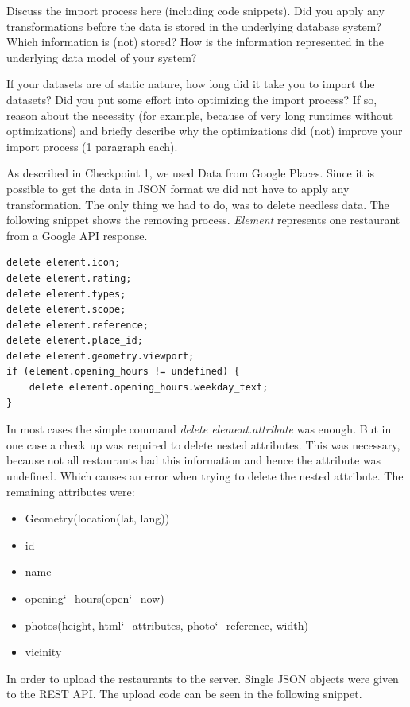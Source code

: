 Discuss the import process here (including code snippets). Did you apply any
transformations before the data is stored in the underlying database system?
Which information is (not) stored? How is the information represented in the
underlying data model of your system?

If your datasets are of static nature, how long did it take you to import the
datasets? Did you put some effort into optimizing the import process? If so,
reason about the necessity (for example, because of very long runtimes without
optimizations) and briefly describe why the optimizations did (not) improve your
import process (1 paragraph each).

As described in Checkpoint 1, we used Data from Google Places. Since it is possible to get the data in JSON format we did not have to apply any transformation. The only thing we had to do, was to delete needless data. The following snippet shows the removing process. \textit{Element} represents one restaurant from a Google API response.

\begin{lstlisting}
delete element.icon;
delete element.rating;
delete element.types;
delete element.scope;
delete element.reference;
delete element.place_id;
delete element.geometry.viewport;
if (element.opening_hours != undefined) {
	delete element.opening_hours.weekday_text;
}
\end{lstlisting}

In most cases the simple command \textit{delete element.attribute} was enough. But in one case a check up was required to delete nested attributes. This was necessary, because not all restaurants had this information and hence the attribute was undefined. Which causes an error when trying to delete the nested attribute. The remaining attributes were:

\begin{itemize}  
\item Geometry(location(lat, lang))
\item id
\item name
\item opening\char`_hours(open\char`_now)
\item photos(height, html\char`_attributes, photo\char`_reference, width)
\item vicinity
\end{itemize}

In order to upload the restaurants to the server. Single JSON objects were given to the REST API. The upload code can be seen in the following snippet.

